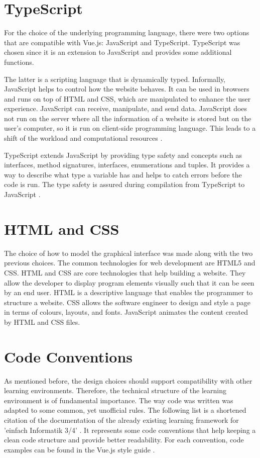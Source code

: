 \section{TypeScript}
\label{section:typescript}

For the choice of the underlying programming language, there were two options that are compatible with Vue.js: JavaScript and TypeScript. TypeScript was chosen since it is an extension to JavaScript and provides some additional functions. 

The latter is a scripting language that is dynamically typed. Informally, JavaScript helps to control how the website behaves. It can be used in browsers and runs on top of HTML and CSS, which are manipulated to enhance the user experience. JavaScript can receive, manipulate, and send data. JavaScript does not run on the server where all the information of a website is stored but on the user's computer, so it is run on client-side programming language. This leads to a shift of the workload and computational resources \cite{Javascript}. 

TypeScript extends JavaScript by providing type safety and concepts such as interfaces, method signatures, interfaces, enumerations and tuples. It provides a way to describe what type a variable has and helps to catch errors before the code is run. The type safety is assured during compilation from TypeScript to JavaScript \cite{Typescript}.

\section{HTML and CSS}
\label{subsection:html}
The choice of how to model the graphical interface was made along with the two previous choices. The common technologies for web development are HTML5 and CSS. HTML and CSS are core technologies that help building a website. They allow the developer to display program elements visually such that it can be seen by an end user. HTML is a descriptive language that enables the programmer to structure a website. CSS allows the software engineer to design and style a page in terms of colours, layouts, and fonts. JavaScript animates the content created by HTML and CSS files.

\section{Code Conventions}
As mentioned before, the design choices should support compatibility with other learning environments. Therefore, the technical structure of the learning environment is of fundamental importance.
The way code was written was adapted to some common, yet unofficial rules. The following list is a shortened citation of the documentation of the already existing learning framework for 'einfach Informatik 3/4' \cite{FBWT}. It represents some code conventions that help keeping a clean code structure and provide better readability. For each convention, code examples can be found in the Vue.js style guide \cite{VueStyleGuide}.


